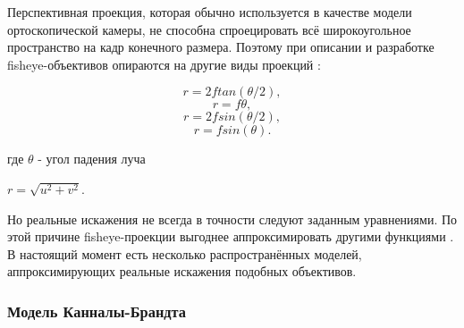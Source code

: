 Перспективная проекция, которая обычно используется в качестве модели ортоскопической камеры, не способна спроецировать всё широкоугольное пространство на кадр 
конечного размера. Поэтому при описании и разработке fisheye-объективов опираются на другие виды проекций  \cite{projections}:

\begin{eqseries}
    \begin{equation}
        \label{fy1}
    r = 2 f tan(\theta/2),  
    \end{equation}
    \begin{equation}
        \label{fy2}
    r = f \theta,
    \end{equation}
    \begin{equation}
        \label{fy3}
    r = 2 f sin(\theta/2),
    \end{equation}
    \begin{equation}
        \label{fy4}
    r = f sin(\theta).
    \end{equation}
\end{eqseries}    

где $\theta$ - угол падения луча

\qquad $r=\sqrt{u^2+v^2}$.

Но реальные искажения не всегда в точности следуют заданным уравнениями.
По этой причине fisheye-проекции выгоднее аппроксимировать другими функциями \cite{opencv_model}.
В настоящий момент есть несколько распространённых моделей, аппроксимирующих реальные искажения подобных объективов. 

\vspace{\baselineskip}

\subsubsection{Модель Канналы-Брандта}

